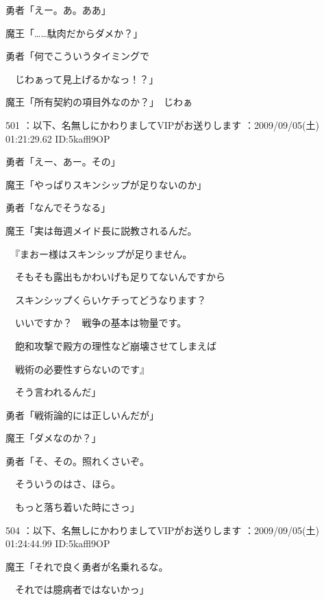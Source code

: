 \documentclass[a4j,twocolumn]{tarticle}
\begin{document}
勇者「えー。あ。ああ」\par{} 
魔王「……駄肉だからダメか？」 



勇者「何でこういうタイミングで\par{} 
　じわぁって見上げるかなっ！？」 



魔王「所有契約の項目外なのか？」　じわぁ 

	
    
    

501 ：以下、名無しにかわりましてVIPがお送りします ：2009/09/05(土) 01:21:29.62 ID:5kaffl9OP 


勇者「えー、あー。その」\par{} 
魔王「やっぱりスキンシップが足りないのか」 



勇者「なんでそうなる」 



魔王「実は毎週メイド長に説教されるんだ。\par{}\par{}

　『まおー様はスキンシップが足りません。\par{} 
　そもそも露出もかわいげも足りてないんですから\par{} 
　スキンシップくらいケチってどうなります？\par{} 
　いいですか？　戦争の基本は物量です。\par{} 
　飽和攻撃で殿方の理性など崩壊させてしまえば\par{} 
　戦術の必要性すらないのです』\par{}\par{}

　そう言われるんだ」 



勇者「戦術論的には正しいんだが」 



魔王「ダメなのか？」\par{} 
勇者「そ、その。照れくさいぞ。\par{} 
　そういうのはさ、ほら。\par{} 
　もっと落ち着いた時にさっ」 

	
    
    

504 ：以下、名無しにかわりましてVIPがお送りします ：2009/09/05(土) 01:24:44.99 ID:5kaffl9OP 


魔王「それで良く勇者が名乗れるな。\par{} 
　それでは臆病者ではないかっ」 
\end{document}
